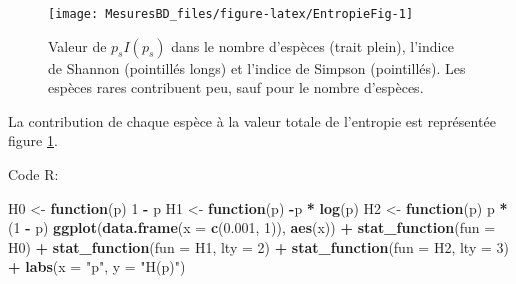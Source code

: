 \documentclass[
  11pt,
  french,
  a4paper,
  extrafontsizes,onecolumn,openright
  ]{memoir}
\newenvironment{Shaded}{\begin{snugshade}}{\end{snugshade}}
\newcommand{\ControlFlowTok}[1]{\textcolor[rgb]{0.13,0.29,0.53}{\textbf{#1}}}
\newcommand{\DataTypeTok}[1]{\textcolor[rgb]{0.13,0.29,0.53}{#1}}
\newcommand{\DecValTok}[1]{\textcolor[rgb]{0.00,0.00,0.81}{#1}}
\newcommand{\FloatTok}[1]{\textcolor[rgb]{0.00,0.00,0.81}{#1}}
\newcommand{\KeywordTok}[1]{\textcolor[rgb]{0.13,0.29,0.53}{\textbf{#1}}}
\newcommand{\NormalTok}[1]{#1}
\newcommand{\OperatorTok}[1]{\textcolor[rgb]{0.81,0.36,0.00}{\textbf{#1}}}
\newcommand{\StringTok}[1]{\textcolor[rgb]{0.31,0.60,0.02}{#1}}
\begin{document}
\normalsize



\scriptsize

\begin{figure}

{\centering \texttt{[image: MesuresBD\_files/figure-latex/EntropieFig-1]} 

}

\caption{Valeur de \(p_{s}I(p_s)\) dans le nombre d'espèces (trait plein), l'indice de Shannon (pointillés longs) et l'indice de Simpson (pointillés). Les espèces rares contribuent peu, sauf pour le nombre d'espèces.}\label{fig:EntropieFig}
\end{figure}

\normalsize

La contribution de chaque espèce à la valeur totale de l'entropie est représentée figure \ref{fig:EntropieFig}.

Code R:

\scriptsize

\begin{Shaded}
\begin{Highlighting}[]
\NormalTok{H0 <-}\StringTok{ }\ControlFlowTok{function}\NormalTok{(p) }\DecValTok{1} \OperatorTok{-}\StringTok{ }\NormalTok{p}
\NormalTok{H1 <-}\StringTok{ }\ControlFlowTok{function}\NormalTok{(p) }\OperatorTok{-}\NormalTok{p }\OperatorTok{*}\StringTok{ }\KeywordTok{log}\NormalTok{(p)}
\NormalTok{H2 <-}\StringTok{ }\ControlFlowTok{function}\NormalTok{(p) p }\OperatorTok{*}\StringTok{ }\NormalTok{(}\DecValTok{1} \OperatorTok{-}\StringTok{ }\NormalTok{p)}
\KeywordTok{ggplot}\NormalTok{(}\KeywordTok{data.frame}\NormalTok{(}\DataTypeTok{x =} \KeywordTok{c}\NormalTok{(}\FloatTok{0.001}\NormalTok{, }\DecValTok{1}\NormalTok{)), }\KeywordTok{aes}\NormalTok{(x)) }\OperatorTok{+}\StringTok{ }\KeywordTok{stat_function}\NormalTok{(}\DataTypeTok{fun =}\NormalTok{ H0) }\OperatorTok{+}\StringTok{ }
\StringTok{    }\KeywordTok{stat_function}\NormalTok{(}\DataTypeTok{fun =}\NormalTok{ H1, }\DataTypeTok{lty =} \DecValTok{2}\NormalTok{) }\OperatorTok{+}\StringTok{ }\KeywordTok{stat_function}\NormalTok{(}\DataTypeTok{fun =}\NormalTok{ H2, }
    \DataTypeTok{lty =} \DecValTok{3}\NormalTok{) }\OperatorTok{+}\StringTok{ }\KeywordTok{labs}\NormalTok{(}\DataTypeTok{x =} \StringTok{"p"}\NormalTok{, }\DataTypeTok{y =} \StringTok{"H(p)"}\NormalTok{)}
\end{Highlighting}
\end{Shaded}

\normalsize
\end{document}
